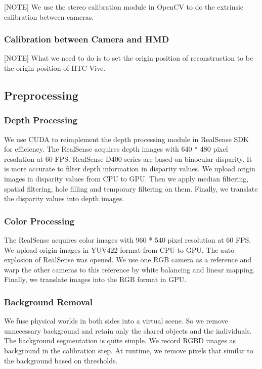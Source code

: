 [NOTE] We use the stereo calibration module in OpenCV to do the extrinsic calibration between cameras.

\subsubsection{Calibration between Camera and HMD}

[NOTE] What we need to do is to set the origin position of reconstruction to be the origin position of HTC Vive.

\subsection{Preprocessing}

\subsubsection{Depth Processing}

We use CUDA to reimplement the depth processing module in RealSense SDK for efficiency. The RealSense acquires depth images with 640 * 480 pixel resolution at 60 FPS. RealSense D400-series are based on binocular disparity. It is more accurate to filter depth information in disparity values. We upload origin images in disparity values from CPU to GPU. Then we apply median filtering, spatial filtering, hole filling and temporary filtering on them. Finally, we translate the disparity values into depth images.

\subsubsection{Color Processing}

The RealSense acquires color images with 960 * 540 pixel resolution at 60 FPS. We upload origin images in YUV422 format from CPU to GPU. The auto explosion of RealSense was opened. We use one RGB camera as a reference and warp the other cameras to this reference by white balancing and linear mapping. Finally, we translate images into the RGB format in GPU.

\subsubsection{Background Removal}

We fuse physical worlds in both sides into a virtual scene. So we remove unnecessary background and retain only the shared objects and the individuals. The background segmentation is quite simple. We record RGBD images as background in the calibration step. At runtime, we remove pixels that similar to the background based on thresholds.

